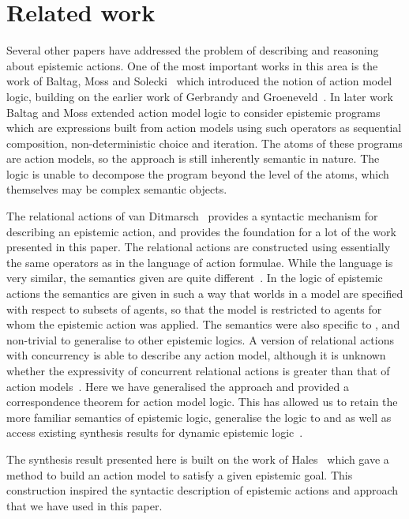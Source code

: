 \section{Related work}\label{related-work}

Several other papers have addressed the problem of describing and reasoning about epistemic actions.
One of the most important works in this area is the work of Baltag, Moss and Solecki~\cite{baltag:1998} which introduced the notion of action model logic, building on the earlier work of Gerbrandy and Groeneveld~\cite{gerbrandy:1997}.
In later work Baltag and Moss extended action model logic to consider epistemic programs~\cite{baltag:2004} which are expressions built from action models using such operators as sequential composition, non-deterministic choice and iteration.
The atoms of these programs are action models, so the approach is still inherently semantic in nature.
The logic is unable to decompose the program beyond the level of the atoms, which themselves may be complex semantic objects.

The relational actions of van Ditmarsch~\cite{vanditmarsch:2000} provides a syntactic mechanism for describing an epistemic action, and provides the foundation for a lot of the work presented in this paper.
The relational actions are constructed using essentially the same operators as in the language of action formulae.
While the language is very similar, the semantics given are quite different~\cite{vanditmarsch:2007}.
In the logic of epistemic actions the semantics are given in such a way that worlds in a model are specified with respect to subsets of agents, so that the model is restricted to agents for whom the epistemic action was applied.
The semantics were also specific to \classS{}, and non-trivial to generalise to other epistemic logics.
A version of relational actions with concurrency is able to describe any \classS{} action model, although it is unknown whether the expressivity of concurrent relational actions is greater than that of action models~\cite{baltag:2006}.
Here we have generalised the approach and provided a correspondence theorem for action model logic.
This has allowed us to retain the more familiar semantics of epistemic logic, generalise the logic to \classK{} and \classKFF{} as well as access existing synthesis results for dynamic epistemic logic~\cite{hales:2013}.

The synthesis result presented here is built on the work of Hales~\cite{hales:2013} which gave a method to build an action model to satisfy a given epistemic goal.
This construction inspired the syntactic description of epistemic actions and approach that we have used in this paper.

